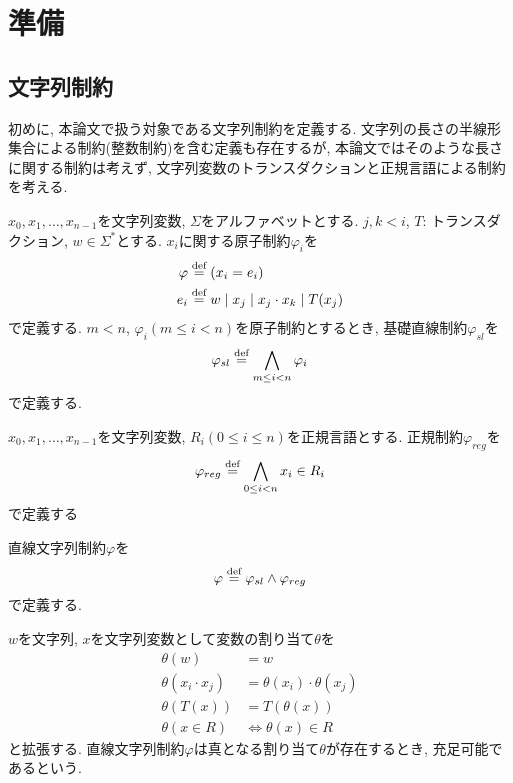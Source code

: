 \documentclass[uplatex,dvipdfmx,a4j]{jsreport}
\begin{document}
  \chapter{準備}  \label{chap:preliminalies}

  \section{文字列制約}

  初めに, 本論文で扱う対象である文字列制約を定義する.
  文字列の長さの半線形集合による制約(整数制約)を含む定義も存在するが,
  本論文ではそのような長さに関する制約は考えず, 文字列変数のトランスダクションと正規言語による制約
  を考える.

  \begin{definition}[基礎直線制約]
    $x_0, x_1, \ldots, x_{n - 1}$を文字列変数, $\Sigma$をアルファベットとする.
    $j, k < i$, $T$: トランスダクション, $w \in \Sigma^*$とする.
    $x_i$に関する原子制約$\varphi_i$を
    \begin{align*}
      \varphi &\overset{\scriptsize \mbox{def}}{=} (x_i = e_i)  \\
      e_i &\overset{\scriptsize \mbox{def}}{=} w \mid x_j \mid x_j \cdot x_k \mid T(x_j)
    \end{align*}
    で定義する.
    $m < n$, $\varphi_i (m \leq i < n)$を原子制約とするとき,
    基礎直線制約$\varphi_{sl}$を
    \[
      \varphi_{sl} \overset{\scriptsize \mbox{def}}{=} \bigwedge_{m \leq i < n} \varphi_i
    \]
    で定義する.
  \end{definition}

  \begin{definition}[正規制約]
    $x_0, x_1, \ldots, x_{n - 1}$を文字列変数, $R_i (0 \leq i \le n)$を正規言語とする.
    正規制約$\varphi_{reg}$を
    \[
      \varphi_{reg} \overset{\scriptsize \mbox{def}}{=} \bigwedge_{0 \leq i < n} x_i \in R_i
    \]
    で定義する
  \end{definition}

  \begin{definition}[文字列制約]
    直線文字列制約$\varphi$を
    \[
      \varphi \overset{\scriptsize \mbox{def}}{=} \varphi_{sl} \land \varphi_{reg}
    \]
    で定義する.
  \end{definition}

  $w$を文字列, $x$を文字列変数として変数の割り当て$\theta$を
  \begin{align*}
    \theta(w) &= w \\
    \theta(x_i \cdot x_j) &= \theta(x_i) \cdot \theta(x_j)  \\
    \theta(T(x)) &= T(\theta(x))  \\
    \theta(x \in R) &\Leftrightarrow \theta(x) \in R
  \end{align*}
  と拡張する.
  直線文字列制約$\varphi$は真となる割り当て$\theta$が存在するとき, 充足可能であるという.
\end{document}
